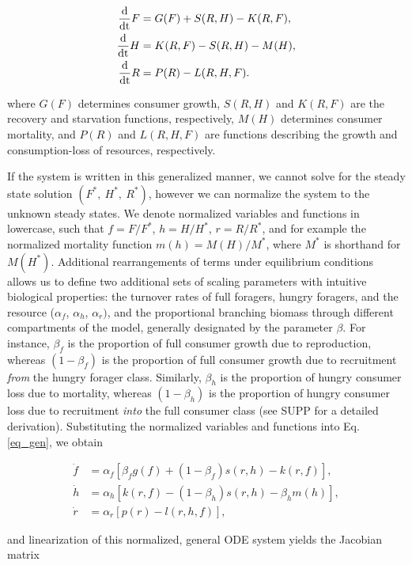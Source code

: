 \documentclass[12pt,english]{article}
\begin{document}
\begin{spacing}{1.9}
\begin{align}
\frac{\rm d}{\rm dt} F &= G(F) + S(R,H) - K(R,F), \nonumber \\
\frac{\rm d}{\rm dt} H &= K(R,F) - S(R,H) - M(H), \nonumber \\
\frac{\rm d}{\rm dt} R &= P(R) - L(R,H,F).
\label{eq_gen}
\end{align}

\noindent where $G(F)$ determines consumer growth, $S(R,H)$ and $K(R,F)$ are the recovery and starvation functions, respectively, $M(H)$ determines consumer mortality, and $P(R)$ and $L(R,H,F)$ are functions describing the growth and consumption-loss of resources, respectively.


If the system is written in this generalized manner, we cannot solve for the steady state solution $(F^*,~H^*,~R^*)$, however we can normalize the system to the unknown steady states.
We denote normalized variables and functions in lowercase, such that $f = F/F^*$, $h = H/H^*$, $r = R/R^*$, and for example the normalized mortality function $m(h) = M(H)/M^*$, where $M^*$ is shorthand for $M(H^*)$.
Additional rearrangements of terms under equilibrium conditions allows us to define two additional sets of scaling parameters with intuitive biological properties: the turnover rates of full foragers, hungry foragers, and the resource ($\alpha_f$, $\alpha_h$, $\alpha_r)$, and the proportional branching biomass through different compartments of the model, generally designated by the parameter $\beta$.
For instance, $\beta_f$ is the proportion of full consumer growth due to reproduction, whereas $(1-\beta_f)$ is the proportion of full consumer growth due to recruitment \emph{from} the hungry forager class.
Similarly, $\beta_h$ is the proportion of hungry consumer loss due to mortality, whereas $(1-\beta_h)$ is the proportion of hungry consumer loss due to recruitment \emph{into} the full consumer class (see SUPP for a detailed derivation).
Substituting the normalized variables and functions into Eq. \ref{eq_gen}, we obtain

 
\begin{align}
\dot{f} &= \alpha_f \left[ \beta_f g(f) + (1-\beta_f)s(r,h) - k(r,f)\right], \nonumber \\
\dot{h} &= \alpha_h \left[ k(r,f) - (1-\beta_h)s(r,h) - \beta_h m(h) \right], \nonumber \\
\dot{r} &= \alpha_r \left[ p(r) - l(r,h,f) \right],
\label{eq_gen}
\end{align}

\noindent and linearization of this normalized, general ODE system yields the Jacobian matrix


\end{spacing}
\end{document}

